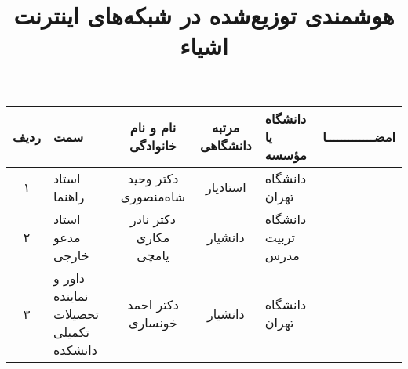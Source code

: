 \subject{مهندسی برق}

\title{هوشمندی توزیع‌شده در شبکه‌های اینترنت اشیاء}

\firstPage

\cleartorightpage
\besmPage

\cleartorightpage
\firstPage

\cleartorightpage


%
  


 \davaranPage
\vspace{.5cm}
\renewcommand{\arraystretch}{1.2}
 \begin{center}
   \begin{tabular}{|c|p{30mm}|c|c|p{25mm}|c|}
     \hline
     ردیف& سمت& نام و نام خانوادگی& مرتبه \newline دانشگاهی&دانشگاه یا مؤسسه& امضـــــــــــــا \\
     \hline
     ۱& استاد راهنما& دکتر وحید شاه‌منصوری& استاد‌یار& دانشگاه تهران                   &\\
     \hline
     ۲&‌استاد مدعو خارجی&دکتر نادر مکاری یامچی&دانشیار& دانشگاه \newline تربیت مدرس&                    \\
     \hline
     ۳& داور و نماینده \newline تحصیلات تکمیلی دانشکده & دکتر احمد خونساری&دانشیار                   & دانشگاه تهران& \\
     \hline
   \end{tabular}
 \end{center}

